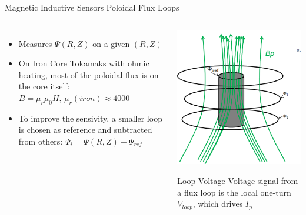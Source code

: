 \documentclass{beamer}
\begin{document}
\begin{frame}{Magnetic Inductive Sensors } {Poloidal Flux  Loops}
\begin{columns}
  \begin{itemize}
  \item Measures $\Psi(R, Z)$ on a given $(R, Z)$
  \item On Iron Core Tokamaks with ohmic heating, most of the poloidal flux is on the core itself:
$B = \mu_r \mu_0 H, \, \mu_r(iron) \approx 4000$
 \item To improve the sensivity, a smaller loop is chosen as reference and subtracted from others:
$\Psi_{i} =\Psi(R, Z)  - \Psi_{ref} $
 \end{itemize}

	\begin{center}
	\includegraphics[width=.6\columnwidth]{fluxloops.png}
   	\begin{block}{Loop Voltage}
		Voltage signal from a flux loop is the local one-turn
	$V_{loop}$, which drives $I_p$
  	\end{block}
	\end{center}

\end{columns}
\end{frame}
\end{document}
